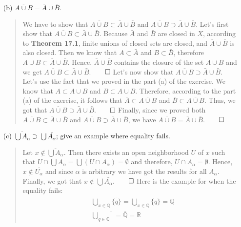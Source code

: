 \documentclass[12pt, a4paper]{article}
\newcommand{\rats}{\mathbb{Q}} %
\newcommand{\reals}{\mathbb{R}} %
\begin{document}
\begin{itemize}
\begin{itemize}
\item[(b)]
$\overline{A \cup B} = \bar{A} \cup \bar{B}$.
\begin{quote}
We have to show that $\overline{A \cup B} \subset \bar{A} \cup \bar{B}$
and $\overline{A \cup B} \supset \bar{A} \cup \bar{B}$.
\newline
\newline
Let's first show that $\overline{A \cup B} \subset \bar{A} \cup \bar{B}$.
Because $\bar{A}$ and $\bar{B}$ are closed in $X$, according to \textbf{Theorem 17.1},
finite unions of closed sets are closed, and $\bar{A} \cup \bar{B}$ is also closed.
Then we know that $A \subset \bar{A}$ and $B \subset \bar{B}$, therefore $A \cup B \subset \bar{A} \cup \bar{B}$.
Hence, $\bar{A} \cup \bar{B}$ contains the closure of the set $A \cup B$ and we get $\overline{A \cup B} \subset \bar{A} \cup \bar{B}$.$\qed$
\newline
\newline
Let's now show that $\overline{A \cup B} \supset \bar{A} \cup \bar{B}$.
Let's use the fact that we proved in the part (a) of the exercise.
We know that $A \subset A \cup B$ and $B \subset A \cup B$. Therefore,
according to the part (a) of the exercise, it follows that $\bar{A} \subset \overline{A \cup B}$
and $\bar{B} \subset \overline{A \cup B}$. Thus, we got that $\overline{A \cup B} \supset \bar{A} \cup \bar{B}$.$\qed$
\newline
\newline
Finally, since we proved both $\overline{A \cup B} \subset \bar{A} \cup \bar{B}$
and $\overline{A \cup B} \supset \bar{A} \cup \bar{B}$, we have $\overline{A \cup B} = \bar{A} \cup \bar{B}$.$\qed$
\end{quote}

\item[]
\item[]

\item[(c)]
$\overline{\bigcup A_\alpha} \supset \bigcup \bar{A_\alpha}$; give an example where equality fails.
\begin{quote}
Let $x \notin \overline{\bigcup A_\alpha}$. Then there exists an open neighborhood $U$ of $x$
such that $U \cap \bigcup A_\alpha = \bigcup (U \cap A_\alpha) = \emptyset$ and therefore, $U \cap A_\alpha = \emptyset$.
Hence, $x \notin \bar{U_\alpha}$ and since $\alpha$ is arbitrary
we have got the results for all $A_\alpha$. Finally, we got that $x \notin \bigcup \bar{A_\alpha}$.$\qed$
\newline
\newline
Here is the example for when the equality fails:
\begin{align*}
&\bigcup_{x \in \rats} \overline{\{q\}} = \bigcup_{x \in \rats} \{q\} = \rats\\
&\overline{\bigcup_{q \in \rats}} = \overline{\rats} = \reals
\end{align*}
\end{quote}
\end{itemize}


\end{itemize}
\end{document}

